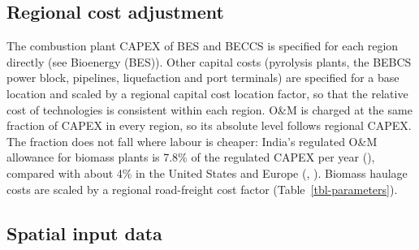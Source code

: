 \documentclass[
  letterpaper,
]{article}
\begin{document}
\subsection{Regional cost adjustment}\label{regional-cost-adjustment}

The combustion plant CAPEX of BES and BECCS is specified for each region
directly (see Bioenergy (BES)). Other capital costs (pyrolysis plants,
the BEBCS power block, pipelines, liquefaction and port terminals) are
specified for a base location and scaled by a regional capital cost
location factor, so that the relative cost of technologies is consistent
within each region. O\&M is charged at the same fraction of CAPEX in
every region, so its absolute level follows regional CAPEX. The fraction
does not fall where labour is cheaper: India's regulated O\&M allowance
for biomass plants is 7.8\% of the regulated CAPEX per year
(), compared with about 4\% in the
United States and Europe (,
). Biomass haulage costs are scaled by
a regional road-freight cost factor (Table~\ref{tbl-parameters}).

\subsection{Spatial input data}\label{spatial-input-data}
\end{document}
